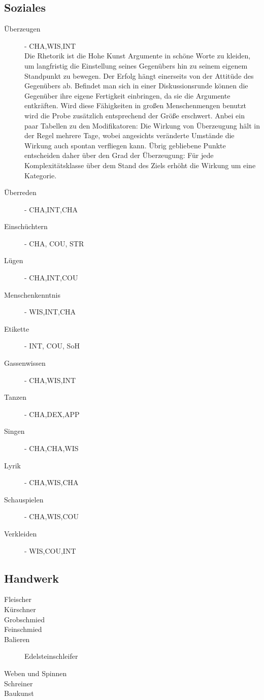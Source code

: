 \documentclass[a4paper,12pt,oneside]{book}
\begin{document}
\subsection{Soziales}
\begin{description}
\item[Überzeugen]- CHA,WIS,INT
\\Die Rhetorik ist die Hohe Kunst Argumente in schöne Worte zu kleiden, um langfristig die Einstellung seines Gegenübers hin zu seinem eigenem Standpunkt zu bewegen. Der Erfolg hängt einerseits von der Attitüde des Gegenübers ab. Befindet man sich in einer Diskussionsrunde können die Gegenüber ihre eigene Fertigkeit einbringen, da sie die Argumente entkräften. Wird diese Fähigkeiten in großen Menschenmengen benutzt wird die Probe zusätzlich entsprechend der Größe erschwert. Anbei ein paar Tabellen zu den Modifikatoren:
Die Wirkung von Überzeugung hält in der Regel mehrere Tage, wobei angesichts veränderte Umstände die Wirkung auch spontan verfliegen kann. Übrig gebliebene Punkte entscheiden daher über den Grad der Überzeugung:
Für jede Komplexitätsklasse über dem Stand des Ziels erhöht die Wirkung um eine Kategorie.
\item[Überreden]- CHA,INT,CHA
\item[Einschüchtern]- CHA, COU, STR
\item[Lügen]- CHA,INT,COU
\item[Menschenkenntnis]- WIS,INT,CHA
\item[Etikette]- INT, COU, SoH
\item[Gassenwissen]- CHA,WIS,INT
\item[Tanzen]- CHA,DEX,APP
\item[Singen]- CHA,CHA,WIS
\item[Lyrik]- CHA,WIS,CHA
\item[Schauspielen]- CHA,WIS,COU
\item[Verkleiden]- WIS,COU,INT


\end{description}
\subsection{Handwerk}
\begin{description}
\item[Fleischer]
\item[Kürschner]
\item[Grobschmied]
\item[Feinschmied]
\item[Balieren]Edelsteinschleifer
\item[Weben und Spinnen]
\item[Schreiner]
\item[Baukunst]

\end{description}
\end{document}
